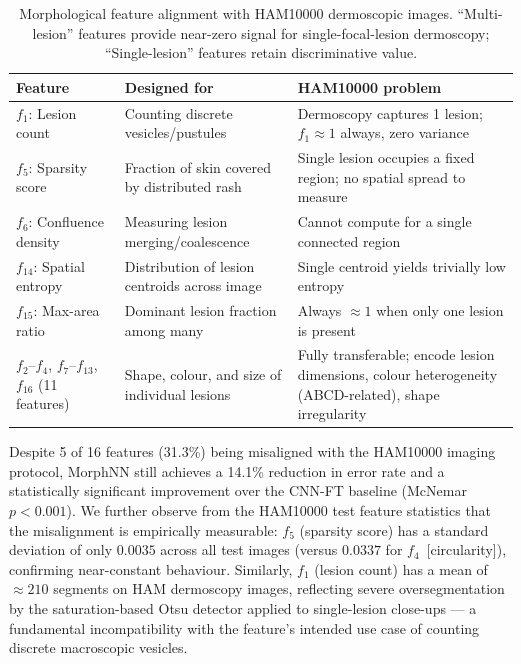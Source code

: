 \documentclass[preprint,12pt]{elsarticle}
\begin{document}
\begin{table}[htbp]
\centering
\caption{Morphological feature alignment with HAM10000 dermoscopic images.
  ``Multi-lesion'' features provide near-zero signal for single-focal-lesion
  dermoscopy; ``Single-lesion'' features retain discriminative value.}
\label{tab:feature_alignment}
\setlength{\tabcolsep}{4pt}
\renewcommand{\arraystretch}{1.12}
\begin{tabular}{lp{4.5cm}p{5cm}}
\toprule
\textbf{Feature} & \textbf{Designed for} & \textbf{HAM10000 problem} \\
\midrule
$f_1$: Lesion count &
  Counting discrete vesicles/pustules &
  Dermoscopy captures 1 lesion; $f_1 \approx 1$ always, zero variance \\
$f_5$: Sparsity score &
  Fraction of skin covered by distributed rash &
  Single lesion occupies a fixed region; no spatial spread to measure \\
$f_6$: Confluence density &
  Measuring lesion merging/coalescence &
  Cannot compute for a single connected region \\
$f_{14}$: Spatial entropy &
  Distribution of lesion centroids across image &
  Single centroid yields trivially low entropy \\
$f_{15}$: Max-area ratio &
  Dominant lesion fraction among many &
  Always $\approx 1$ when only one lesion is present \\
\midrule
$f_2$--$f_4$, $f_7$--$f_{13}$, $f_{16}$ (11 features) &
  Shape, colour, and size of individual lesions &
  Fully transferable; encode lesion dimensions, colour heterogeneity
  (ABCD-related), shape irregularity \\
\bottomrule
\end{tabular}
\end{table}

Despite 5 of 16 features (31.3\%) being misaligned with the HAM10000
imaging protocol, MorphNN still achieves a 14.1\% reduction in error
rate and a statistically significant improvement over the CNN-FT
baseline (McNemar $p < 0.001$).  We further observe from the HAM10000
test feature statistics that the misalignment is empirically
measurable: $f_5$ (sparsity score) has a standard deviation of only
$0.0035$ across all test images (versus $0.0337$ for
$f_4$~[circularity]), confirming near-constant behaviour.  Similarly,
$f_1$ (lesion count) has a mean of $\approx 210$ segments on HAM
dermoscopy images, reflecting severe oversegmentation by the
saturation-based Otsu detector applied to single-lesion close-ups ---
a fundamental incompatibility with the feature's intended use case of
counting discrete macroscopic vesicles.
\end{document}
